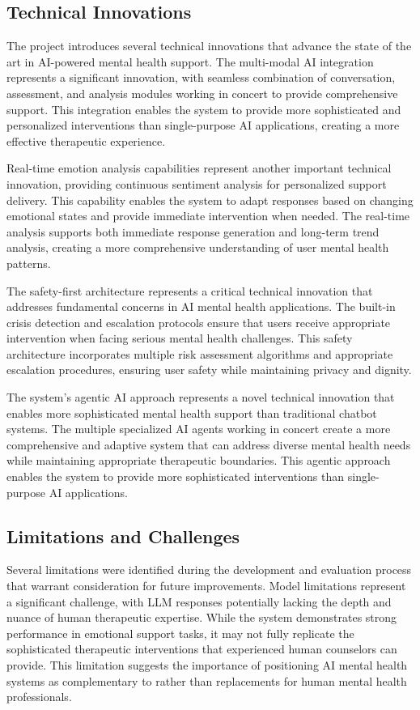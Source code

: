 \subsection{Technical Innovations}

The project introduces several technical innovations that advance the state of the art in AI-powered mental health support. The multi-modal AI integration represents a significant innovation, with seamless combination of conversation, assessment, and analysis modules working in concert to provide comprehensive support. This integration enables the system to provide more sophisticated and personalized interventions than single-purpose AI applications, creating a more effective therapeutic experience.

Real-time emotion analysis capabilities represent another important technical innovation, providing continuous sentiment analysis for personalized support delivery. This capability enables the system to adapt responses based on changing emotional states and provide immediate intervention when needed. The real-time analysis supports both immediate response generation and long-term trend analysis, creating a more comprehensive understanding of user mental health patterns.

The safety-first architecture represents a critical technical innovation that addresses fundamental concerns in AI mental health applications. The built-in crisis detection and escalation protocols ensure that users receive appropriate intervention when facing serious mental health challenges. This safety architecture incorporates multiple risk assessment algorithms and appropriate escalation procedures, ensuring user safety while maintaining privacy and dignity.

The system's agentic AI approach represents a novel technical innovation that enables more sophisticated mental health support than traditional chatbot systems. The multiple specialized AI agents working in concert create a more comprehensive and adaptive system that can address diverse mental health needs while maintaining appropriate therapeutic boundaries. This agentic approach enables the system to provide more sophisticated interventions than single-purpose AI applications.

\subsection{Limitations and Challenges}

Several limitations were identified during the development and evaluation process that warrant consideration for future improvements. Model limitations represent a significant challenge, with LLM responses potentially lacking the depth and nuance of human therapeutic expertise. While the system demonstrates strong performance in emotional support tasks, it may not fully replicate the sophisticated therapeutic interventions that experienced human counselors can provide. This limitation suggests the importance of positioning AI mental health systems as complementary to rather than replacements for human mental health professionals.


